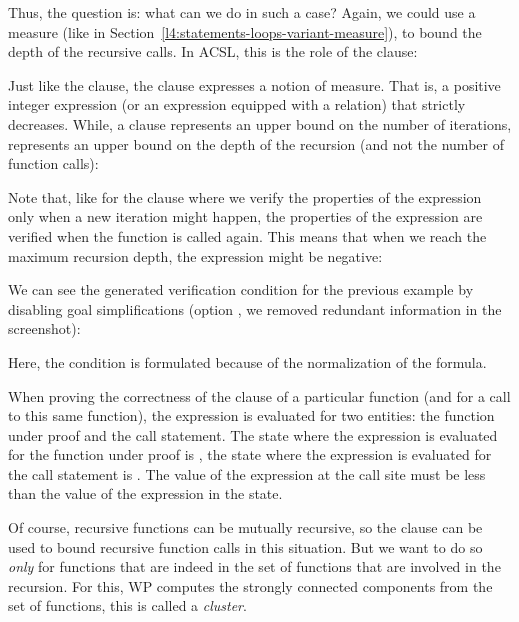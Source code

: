 Thus, the question is: what can we do in such a case? Again, we could use
a measure (like in Section~\ref{l4:statements-loops-variant-measure}), to
bound the depth of the recursive calls. In ACSL, this is the role of the
 clause:




Just like the  clause, the 
clause expresses a notion of measure. That is, a positive integer expression
(or an expression equipped with a relation) that strictly decreases. While, a
 clause represents an upper bound on the number of
iterations,  represents an upper bound on the depth of the
recursion (and not the number of function calls):




Note that, like for the  clause where we verify the
properties of the expression only when a new iteration might happen, the
properties of the  expression are verified when the
function is called again. This means that when we reach the maximum recursion
depth, the expression might be negative:




We can see the generated verification condition for the previous example by
disabling goal simplifications (option , we removed
redundant information in the screenshot):



Here, the condition  is formulated
 because of the normalization of the
formula.


When proving the correctness of the  clause of a particular
function (and for a call to this same function), the expression is evaluated
for two entities: the function under proof and the call statement. The state
where the expression is evaluated for the function under proof is
, the state where the expression is evaluated for the call
statement is . The value of the expression at the call site
must be less than the value of the expression in the  state.




Of course, recursive functions can be mutually recursive, so the
 clause can be used to bound recursive function calls in
this situation. But we want to do so {\em only} for functions that are
indeed in the set of functions that are involved in the recursion. For this, WP
computes the strongly connected components from the set of functions, this is
called a {\em cluster}.

